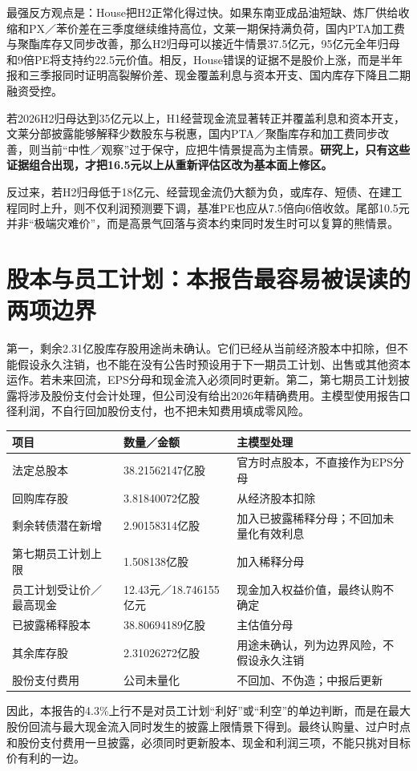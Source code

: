最强反方观点是：House把H2正常化得过快。如果东南亚成品油短缺、炼厂供给收缩和PX／苯价差在三季度继续维持高位，文莱一期保持满负荷，国内PTA加工费与聚酯库存又同步改善，那么H2归母可以接近牛情景37.5亿元，95亿元全年归母和9倍PE将支持约22.5元价值。相反，House错误的证据不是股价上涨，而是半年报和三季报同时证明高裂解价差、现金覆盖利息与资本开支、国内库存下降且二期融资受控。

\begin{riskbox}[什么会证明本报告错了]
若2026H2归母达到35亿元以上，H1经营现金流显著转正并覆盖利息和资本开支，文莱分部披露能够解释少数股东与税惠，国内PTA／聚酯库存和加工费同步改善，则当前“中性／观察”过于保守，应把牛情景提高为主情景。\textbf{研究上，只有这些证据组合出现，才把16.5元以上从重新评估区改为基本面上修区。}
\end{riskbox}

反过来，若H2归母低于18亿元、经营现金流仍大额为负，或库存、短债、在建工程同时上升，则不仅利润预测要下调，基准PE也应从7.5倍向6倍收敛。尾部10.5元并非“极端灾难价”，而是高景气回落与资本约束同时发生时可以复算的熊情景。

\section{股本与员工计划：本报告最容易被误读的两项边界}

第一，剩余2.31亿股库存股用途尚未确认。它们已经从当前经济股本中扣除，但不能假设永久注销，也不能在没有公告时预设用于下一期员工计划、出售或其他资本运作。若未来回流，EPS分母和现金流入必须同时更新。第二，第七期员工计划披露将涉及股份支付会计处理，但公司没有给出2026年精确费用。主模型使用报告口径利润，不自行回加股份支付，也不把未知费用填成零风险。

\begin{exhibitbox}[关键资本结构边界]
\noindent\begin{tabularx}{\textwidth}{L{3.8cm}R{2.2cm}X}
\toprule
\textbf{项目} & \textbf{数量／金额} & \textbf{主模型处理} \\
\midrule
法定总股本 & 38.21562147亿股 & 官方时点股本，不直接作为EPS分母 \\
回购库存股 & 3.81840072亿股 & 从经济股本扣除 \\
剩余转债潜在新增 & 2.90158314亿股 & 加入已披露稀释分母；不回加未量化有效利息 \\
第七期员工计划上限 & 1.508138亿股 & 加入稀释分母 \\
员工计划受让价／最高现金 & 12.43元／18.746155亿元 & 现金加入权益价值，最终认购不确定 \\
已披露稀释股本 & 38.80694189亿股 & 主估值分母 \\
其余库存股 & 2.31026272亿股 & 用途未确认，列为边界风险，不假设永久注销 \\
股份支付费用 & 公司未量化 & 不回加、不伪造；中报后更新 \\
\bottomrule
\end{tabularx}
\end{exhibitbox}

因此，本报告的4.3\%上行不是对员工计划“利好”或“利空”的单边判断，而是在最大股份回流与最大现金流入同时发生的披露上限情景下得到。最终认购量、过户时点和股份支付费用一旦披露，必须同时更新股本、现金和利润三项，不能只挑对目标价有利的一边。
